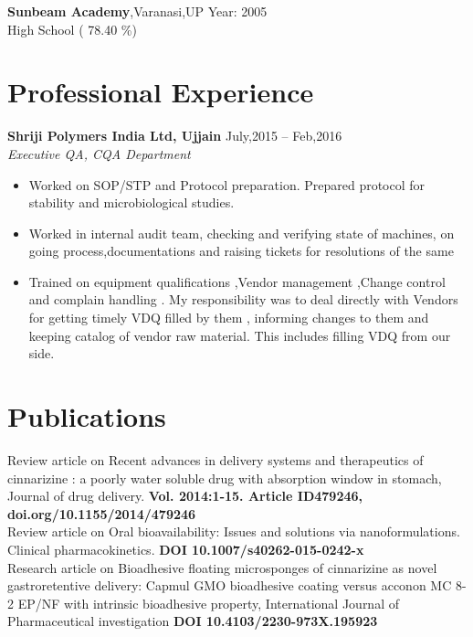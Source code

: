 \documentclass[margin,line]{res}
\begin{document}
\begin{resume}
{\bf Sunbeam Academy},Varanasi,UP \hfill Year: 2005 \\
High School \hfill( 78.40 \%)
\\




\section{\sc Professional Experience}

{\bf Shriji Polymers India Ltd, Ujjain}                 \hfill{July,2015 -- Feb,2016}\\
{\em Executive QA, CQA Department} \hfill \\

\begin{itemize} 
\setlength\itemsep{-1em}

\item Worked on SOP/STP and Protocol preparation. Prepared protocol for stability and microbiological studies.\\
\item Worked in internal audit team, checking and verifying state of machines, on going process,documentations and raising tickets for resolutions of the same\\
\item Trained on equipment qualifications ,Vendor management ,Change control and complain handling . My responsibility was to deal directly with Vendors for getting timely VDQ filled by them , informing changes to them and keeping catalog of vendor raw material. This includes filling VDQ from our side.\\

\end{itemize}





\section{\sc Publications}


Review article on Recent advances in delivery systems and therapeutics of cinnarizine : a poorly water soluble drug with absorption window in stomach, Journal of drug delivery. { \bf Vol. 2014:1-15. Article ID479246, doi.org/10.1155/2014/479246} \vspace{1.5mm}\\
Review article on Oral bioavailability: Issues and solutions via nanoformulations. Clinical pharmacokinetics. { \bf DOI 10.1007/s40262-015-0242-x} \vspace{1.5mm}\\
Research article on Bioadhesive floating microsponges of cinnarizine as novel gastroretentive delivery: Capmul GMO bioadhesive coating versus acconon MC 8-2 EP/NF with intrinsic bioadhesive property, International Journal of Pharmaceutical investigation {\bf  DOI 10.4103/2230-973X.195923} \vspace{1.5mm}






\end{resume}
\end{document}
